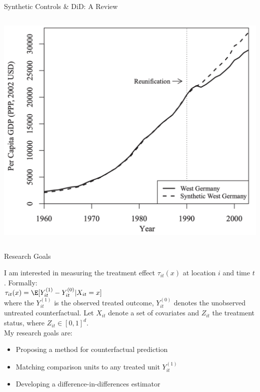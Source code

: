 \begin{frame}{Synthetic Controls \& DiD: A Review}
\begin{columns}
\begin{column}{0.5\linewidth}
        \includegraphics[scale = 0.3]{figures/fig.scmethod.png}\\
        \centering
    \end{column}
  \end{columns}
\end{frame}

\begin{frame}{Research Goals}

I am interested in measuring the treatment effect $\tau_{it}(x)$ at location $i$ and time $t$. Formally: \\ 
\vspace{3pt}
$\tau_{it}(x) = \E [Y_{it}^{(1)} - Y_{it}^{(0)} | X_{it} = x]$ \\
\vspace{3pt}
where the $Y_{it}^{(1)}$ is the observed treated outcome, $Y_{it}^{(0)}$ denotes the unobserved untreated counterfactual. Let $X_{it}$ denote a set of covariates and $Z_{it}$ the treatment status, where $Z_{it} \in [0,1]^{d}$. \\
\vspace{5pt}
My research goals are:\\
\vspace{3pt}
\begin{itemize}
    \item Proposing a method for counterfactual prediction
    \vspace{-7pt}
    \item Matching comparison units to any treated unit $Y_{it}^{(1)}$
    \vspace{-7pt}
    \item Developing a difference-in-differences estimator
\end{itemize}
\end{frame}